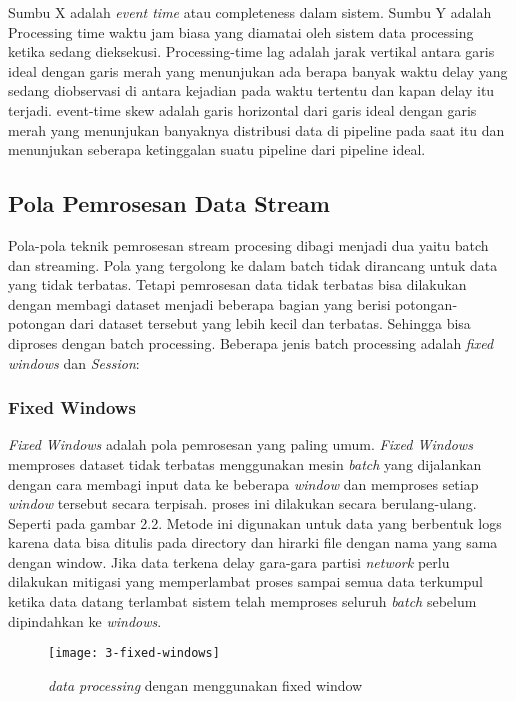 Sumbu X adalah \textit{event time} atau completeness dalam sistem. Sumbu Y adalah Processing time 
waktu jam biasa yang diamatai oleh sistem data processing ketika sedang dieksekusi. Processing-time 
lag adalah jarak vertikal antara garis ideal dengan garis merah yang menunjukan ada berapa banyak
waktu delay yang sedang diobservasi di antara kejadian pada waktu tertentu dan kapan delay itu
terjadi. event-time skew adalah garis horizontal dari garis ideal dengan garis merah yang menunjukan
banyaknya distribusi data di pipeline pada saat itu dan menunjukan seberapa ketinggalan suatu pipeline dari pipeline ideal. 

\subsection{Pola Pemrosesan Data Stream}
Pola-pola teknik pemrosesan stream procesing dibagi menjadi dua yaitu batch dan streaming.
Pola yang tergolong ke dalam batch tidak dirancang untuk data yang tidak terbatas. Tetapi pemrosesan
data tidak terbatas bisa dilakukan dengan membagi dataset menjadi beberapa bagian yang berisi
potongan-potongan dari dataset tersebut yang lebih kecil dan terbatas. Sehingga bisa diproses dengan
batch processing. Beberapa jenis batch processing adalah \textit{fixed windows} dan 
\textit{Session}:



	\subsubsection{Fixed Windows}
	\textit{Fixed Windows} adalah pola pemrosesan yang paling umum. \textit{Fixed Windows} 			
	memproses dataset tidak terbatas menggunakan mesin \textit{batch} yang dijalankan 				
	dengan cara membagi input data ke beberapa \textit{window} dan memproses setiap  				
	\textit{window} tersebut secara terpisah. proses ini dilakukan secara berulang-ulang. 			
	Seperti pada gambar 2.2. Metode ini digunakan untuk data yang berbentuk logs karena 			
	data bisa ditulis pada directory dan hirarki file dengan nama yang sama dengan window.			
	Jika data terkena delay gara-gara partisi \textit{network} perlu dilakukan mitigasi 			
	yang memperlambat proses sampai semua data terkumpul ketika data datang terlambat 				
	sistem telah memproses seluruh \textit{batch} sebelum dipindahkan ke \textit{windows}.
		
		\begin{figure}[H] 
		\centering  
		\texttt{[image: 3-fixed-windows]}  
		\caption[Gambar {\it fixed-windowa}]{\textit{data processing} dengan 					
		menggunakan fixed window} 
		\label{fig:processing-events relationship} 
		\end{figure} 
	

